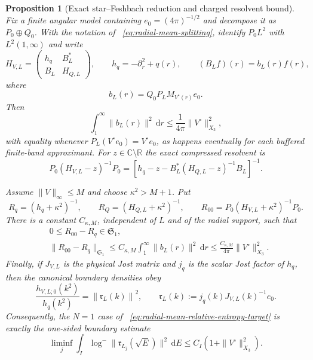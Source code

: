 \documentclass[11pt]{article}
\newcommand{\R}{\mathbb R}
\newcommand{\C}{\mathbb C}
\newcommand{\dd}{\,\mathrm d}
\newtheorem{proposition}[theorem]{Proposition}
\theoremstyle{definition}
\theoremstyle{remark}
\begin{document}
\begin{proposition}[Exact star--Feshbach reduction and charged resolvent bound]
\label{prop:radial-mean-star-Feshbach}
Fix a finite angular model containing $e_0=(4\pi)^{-1/2}$ and decompose it as
$P_0\oplus Q_0$.  With the notation of
~\eqref{eq:radial-mean-splitting}, identify $P_0L^2$ with
$L^2(1,\infty)$ and write
\begin{equation}
 H_{V,L}=
 \begin{pmatrix}
  h_q&B_L^*\\ B_L&H_{Q,L}
 \end{pmatrix},
 \qquad
 h_q=-\partial_r^2+q(r),
 \qquad
 (B_Lf)(r)=b_L(r)f(r),
 \label{eq:star-Feshbach-blocks}
\end{equation}
where
\begin{equation}
 b_L(r)=Q_0P_LM_{V^\circ(r)}e_0.
 \label{eq:star-Feshbach-column}
\end{equation}
Then
\begin{equation}
 \int_1^\infty\|b_L(r)\|^2\dd r
 \leq\frac1{4\pi}\|V^\circ\|_{X_3}^2,
 \label{eq:star-Feshbach-column-cost}
\end{equation}
with equality whenever $P_L(V^\circ e_0)=V^\circ e_0$, as happens eventually
for each buffered finite-band approximant.  For $z\in\C\setminus\R$ the exact
compressed resolvent is
\begin{equation}
 P_0(H_{V,L}-z)^{-1}P_0
 =\left[h_q-z-B_L^*(H_{Q,L}-z)^{-1}B_L\right]^{-1}.
 \label{eq:exact-star-Feshbach-resolvent}
\end{equation}

Assume $\|V\|_\infty\leq M$ and choose $\kappa^2>M+1$.  Put
\begin{equation}
 R_q=(h_q+\kappa^2)^{-1},\qquad
 R_Q=(H_{Q,L}+\kappa^2)^{-1},\qquad
 R_{00}=P_0(H_{V,L}+\kappa^2)^{-1}P_0.
\end{equation}
There is a constant $C_{\kappa,M}$, independent of $L$ and of the radial
support, such that
\begin{align}
 &0\leq R_{00}-R_q\in\mathfrak S_1,
 \label{eq:charged-compressed-resolvent-positive}\\
 &\|R_{00}-R_q\|_{\mathfrak S_1}
 \leq C_{\kappa,M}\int_1^\infty\|b_L(r)\|^2\dd r
 \leq\frac{C_{\kappa,M}}{4\pi}\|V^\circ\|_{X_3}^2.
 \label{eq:charged-compressed-resolvent-trace-bound}
\end{align}
Finally, if $J_{V,L}$ is the physical Jost matrix and $j_q$ is the scalar
Jost factor of $h_q$, then the canonical boundary densities obey
\begin{equation}
 \frac{h_{V,L;0}(k^2)}{h_q(k^2)}
 =\left\|\mathfrak r_L(k)\right\|^2,
 \qquad
 \mathfrak r_L(k):=j_q(k)J_{V,L}(k)^{-1}e_0.
 \label{eq:relative-radiation-column-density}
\end{equation}
Consequently, the $N=1$ case of
~\eqref{eq:radial-mean-relative-entropy-target} is exactly the one-sided
boundary estimate
\begin{equation}
 \liminf_j\int_I
 \log^-\|\mathfrak r_{L_j}(\sqrt E)\|^2\dd E
 \leq C_I\left(1+\|V^\circ\|_{X_3}^2\right).
 \label{eq:relative-radiation-column-entropy-target}
\end{equation}
\end{proposition}
\end{document}
